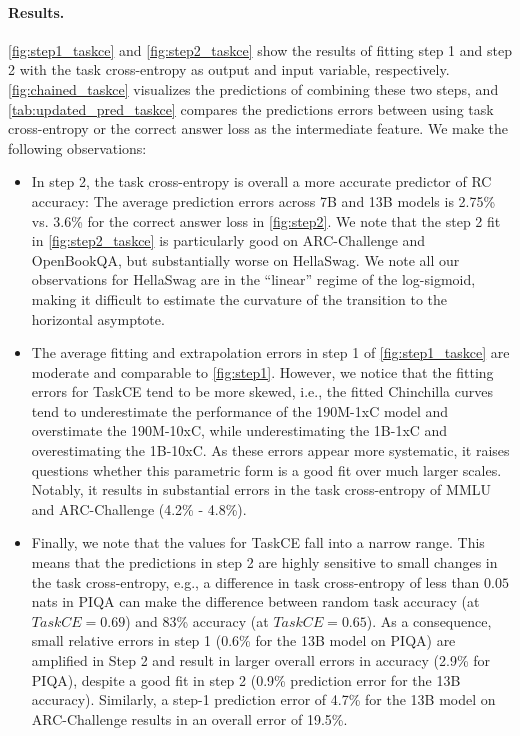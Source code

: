 \paragraph{Results.} \autoref{fig:step1_taskce} and \autoref{fig:step2_taskce} show the results of fitting step 1 and step 2 with the task cross-entropy as output and input variable, respectively. 
\autoref{fig:chained_taskce} visualizes the predictions of combining these two steps, and  \autoref{tab:updated_pred_taskce} compares the predictions errors between using task cross-entropy or the correct answer loss as the intermediate feature. We make the following observations:
\begin{itemize}[leftmargin=16pt]
\item In step 2, the task cross-entropy is overall a more accurate predictor of RC accuracy: The average prediction errors across 7B and 13B models is 2.75\% vs. 3.6\% for the correct answer loss in \autoref{fig:step2}. 
We note that the step 2 fit in \autoref{fig:step2_taskce} is particularly good on ARC-Challenge and OpenBookQA, but substantially worse on HellaSwag. We note all our observations for HellaSwag are in the ``linear'' regime of the log-sigmoid, making it difficult to estimate the curvature of the transition to the horizontal asymptote.

\item The average fitting and extrapolation errors in step 1 of \autoref{fig:step1_taskce} are moderate and comparable to \autoref{fig:step1}. However, we notice that the fitting errors for TaskCE tend to be more skewed, i.e., the fitted Chinchilla curves tend to underestimate the performance of the 190M-1xC model and overstimate the 190M-10xC, while underestimating the 1B-1xC and overestimating the 1B-10xC. As these errors appear more systematic, it raises questions whether this parametric form is a good fit over much larger scales. Notably, it results in substantial errors in the task cross-entropy of MMLU and ARC-Challenge (4.2\% - 4.8\%).

\item Finally, we note that the values for TaskCE fall into a narrow range. This means that the predictions in step 2 are highly sensitive to small changes in the task cross-entropy, e.g., a difference in task cross-entropy of less than $0.05$ nats in PIQA can make the difference between random task accuracy (at $TaskCE = 0.69$) and 83\% accuracy (at $TaskCE = 0.65$). As a consequence, small relative errors in step 1 (0.6\% for the 13B model on PIQA) are amplified in Step 2 and result in larger overall errors in accuracy (2.9\% for PIQA), despite a good fit in step 2 (0.9\% prediction error for the 13B accuracy). Similarly, a step-1 prediction error of 4.7\% for the 13B model on ARC-Challenge results in an overall error of 19.5\%.
\end{itemize}

